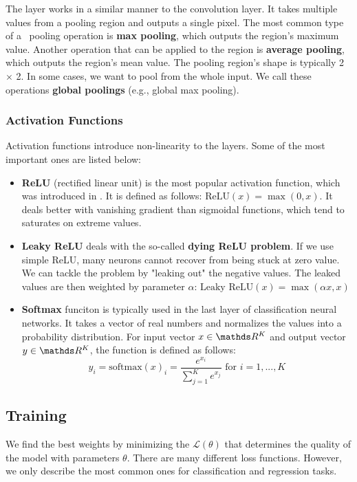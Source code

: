 The layer works in a similar manner to the convolution layer. It takes multiple
values from a pooling region and outputs a single pixel. The most common type of
a~ pooling operation is \textbf{max pooling}, which outputs the region's
maximum value. Another operation that can be applied to the region is
\textbf{average pooling}, which outputs the region's mean value. The pooling
region's shape is typically 2 $\times$ 2. In some cases, we want to
pool from the whole input. We call these operations \textbf{global poolings}
(e.g., global max pooling).

\subsubsection{Activation Functions}
\label{afunctions}

Activation functions introduce non-linearity to the layers. Some of the most
important ones are listed below:
\begin{itemize}
    \item \textbf{ReLU} (rectified linear unit) is the most popular activation
          function, which was introduced in \cite{pmlr-v15-glorot11a}. It is defined
          as follows: $\text{ReLU}(x) = \max(0, x)$. It deals better with vanishing
          gradient than sigmoidal functions, which tend to saturates on extreme values.
    \item \textbf{Leaky ReLU} deals with the so-called
          \textbf{dying ReLU problem}. If we use simple ReLU, many neurons cannot
          recover from being stuck at zero value. We can tackle the problem by
          "leaking out" the negative values. The leaked values are then weighted by
          parameter $\alpha$: $\text{Leaky ReLU}(x) = \max(\alpha x, x)$
    \item \textbf{Softmax} funciton is typically used in the last layer of
          classification neural networks. It takes a vector of real numbers and
          normalizes the values into a probability distribution. For input vector
          $x \in \real^K$ and output vector $y \in \real^K$, the function is defined
          as follows:
          $$
              y_i = \text{softmax}(x)_i = \frac{e^{x_i}}{\sum\limits^{K}_{j = 1}
                  e^{x_j}} \text{ for } i = 1,...,K
          $$
\end{itemize}

\subsection{Training}
\label{sec:training}
We find the best weights by minimizing the  $\mathcal{L(\theta)}$
that determines the quality of the model with parameters $\theta$. There are
many different loss functions. However, we only describe the most common ones
for classification and regression tasks.

